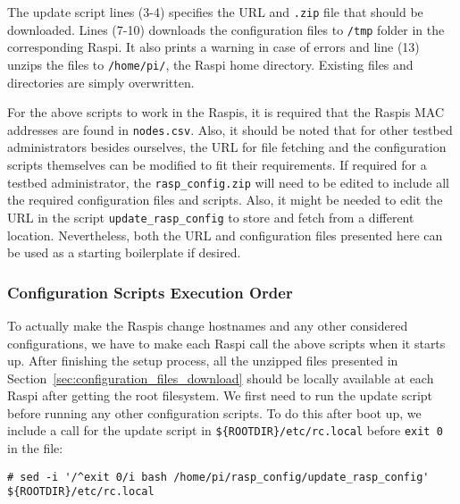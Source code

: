 The update script lines (3-4) specifies the \ac{URL} and \texttt{.zip} file that
should be downloaded. Lines (7-10) downloads the configuration files to \texttt{/tmp}
folder in the corresponding \ac{Raspi}. It also prints a warning in case of
errors and line (13) unzips the files to \texttt{/home/pi/}, the \ac{Raspi} home
directory. Existing files and directories are simply overwritten.

For the above scripts to work in the \ac{Raspi}s, it is required that the
\ac{Raspi}s \ac{MAC} addresses are found in \texttt{nodes.csv}. Also, it
should be noted that for other testbed administrators besides ourselves,
the \ac{URL} for file fetching and the configuration
scripts themselves can be modified to fit their requirements. If
required for a testbed administrator, the \texttt{rasp\_config.zip}
will need to be edited to include all the required configuration files
and scripts. Also, it might be needed to edit the \ac{URL} in the script
\texttt{update\_rasp\_config} to store and fetch from a different location.
Nevertheless, both the \ac{URL} and configuration files presented here can be
used as a starting boilerplate if desired.

\subsubsection{Configuration Scripts Execution Order}
To actually make the \ac{Raspi}s change hostnames and any other considered
configurations, we have to make each \ac{Raspi} call the above scripts when
it starts up. After finishing the setup process, all the unzipped files
presented in Section~\ref{sec:configuration_files_download} should be
locally available at each \ac{Raspi} after getting the root filesystem.
We first need to run the update script before running
any other configuration scripts. To do this after boot up, we include
a call for the update script in \texttt{\$\{ROOTDIR\}/etc/rc.local} before
\texttt{exit 0} in the file:


\Suppressnumber\begin{lstlisting}[]
# sed -i '/^exit 0/i bash /home/pi/rasp_config/update_rasp_config' ${ROOTDIR}/etc/rc.local
\end{lstlisting}
\FloatBarrier
\vspace{-5mm}

